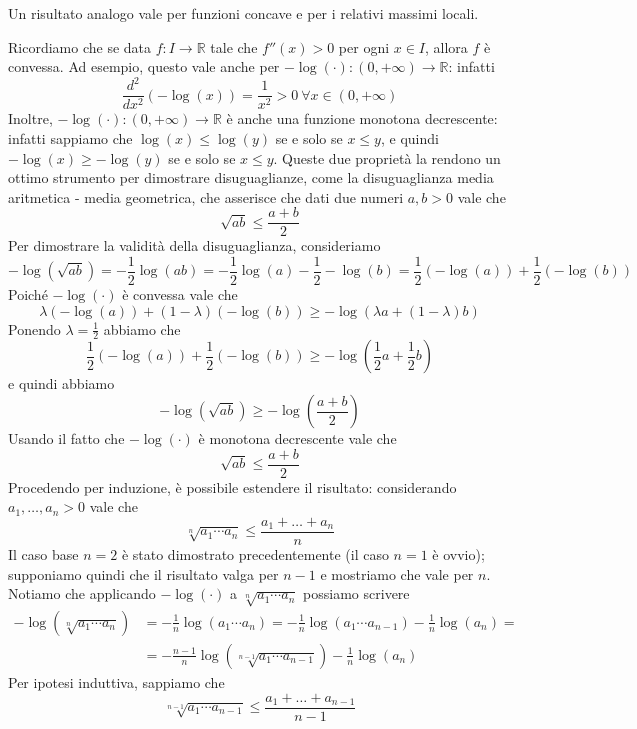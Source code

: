 \begin{remark}
    Un risultato analogo vale per funzioni concave e per i relativi massimi locali.
\end{remark}
\begin{example}
    Ricordiamo che se data $f\colon I \to \mathbb{R}$ tale che $f''(x)>0$ per ogni $x\in I$, allora $f$ è convessa. Ad esempio, questo vale anche per $-\log(\cdot)\colon (0,+\infty)\to\mathbb{R}$: infatti
    \[
    \frac{d^2}{dx^2}(-\log(x)) = \frac{1}{x^2}>0 \ \forall x\in(0,+\infty)
    \]
    Inoltre, $-\log(\cdot)\colon (0,+\infty)\to\mathbb{R}$ è anche una funzione monotona decrescente: infatti sappiamo che $\log(x)\le \log(y)$ se e solo se $x\le y$, e quindi $-\log(x)\ge -\log(y)$ se e solo se $x\le y$. Queste due proprietà la rendono un ottimo strumento per dimostrare disuguaglianze, come la disuguaglianza media aritmetica - media geometrica, che asserisce che dati due numeri $a,b>0$ vale che
    \[
    \sqrt{ab}\le \frac{a+b}{2}
    \]
    Per dimostrare la validità della disuguaglianza, consideriamo
    \[
    -\log(\sqrt{ab}) = -\frac{1}{2}\log(ab) = -\frac{1}{2}\log(a)-\frac{1}{2}-\log(b) = \frac{1}{2}(-\log(a))+\frac{1}{2}(-\log(b))
    \]
    Poiché $-\log(\cdot)$ è convessa vale che
    \[
    \lambda(-\log(a))+(1-\lambda)(-\log(b))\ge -\log(\lambda a+(1-\lambda)b)
    \]
    Ponendo $\lambda = \frac{1}{2}$ abbiamo che
    \[
    \frac{1}{2}(-\log(a))+\frac{1}{2}(-\log(b))\ge -\log(\frac{1}{2} a+\frac{1}{2}b)
    \]
    e quindi abbiamo
    \[
    -\log(\sqrt{ab})\ge -\log\left(\frac{a+b}{2}\right)
    \]
    Usando il fatto che $-\log(\cdot)$ è monotona decrescente vale che
    \[
    \sqrt{ab}\le \frac{a+b}{2}
    \]
    Procedendo per induzione, è possibile estendere il risultato: considerando $a_1, \dots, a_n>0$ vale che
    \[ 
    \sqrt[n]{a_1 \cdots a_n} \le \frac{a_1 + \dots + a_n}{n}
    \]
    Il caso base $n=2$ è stato dimostrato precedentemente (il caso $n=1$ è ovvio); supponiamo quindi che il risultato valga per $n-1$ e mostriamo che vale per $n$. Notiamo che applicando $-\log(\cdot)$ a $\sqrt[n]{a_1 \cdots a_n}$ possiamo scrivere
    \[
    \begin{split}
        -\log(\sqrt[n]{a_1 \cdots a_n})&  = -\frac{1}{n}\log(a_1 \cdots a_n) = -\frac{1}{n}\log(a_1\cdots a_{n-1})-\frac{1}{n}\log(a_n) = \\
        & = -\frac{n-1}{n}\log(\sqrt[n-1]{a_1 \cdots a_{n-1}})-\frac{1}{n}\log(a_n)
    \end{split}
    \]
    Per ipotesi induttiva, sappiamo che 
    \[
    \sqrt[n-1]{a_1 \cdots a_{n-1}} \le \frac{a_1 + \dots + a_{n-1}}{n-1}
\]
\end{example}
